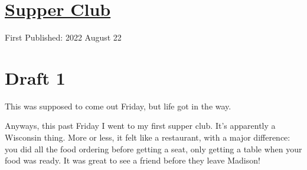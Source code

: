 \documentclass[12pt]{article}[titlepage]
\newcommand{\1}{\={a}}
\newcommand{\2}{\={e}}
\newcommand{\3}{\={\i}}
\newcommand{\4}{\=o}
\newcommand{\5}{\=u}
\newcommand{\6}{\={A}}
\renewcommand{\,}{\textsuperscript{,}}
\begin{document}
\doublespacing
\section{\href{supper-club.html}{Supper Club}}
First Published: 2022 August 22
\section{Draft 1}
This was supposed to come out Friday, but life got in the way.

Anyways, this past Friday I went to my first supper club.
It's apparently a Wisconsin thing.
More or less, it felt like a restaurant, with a major difference: you did all the food ordering before getting a seat, only getting a table when your food was ready.
It was great to see a friend before they leave Madison!
\end{document}
